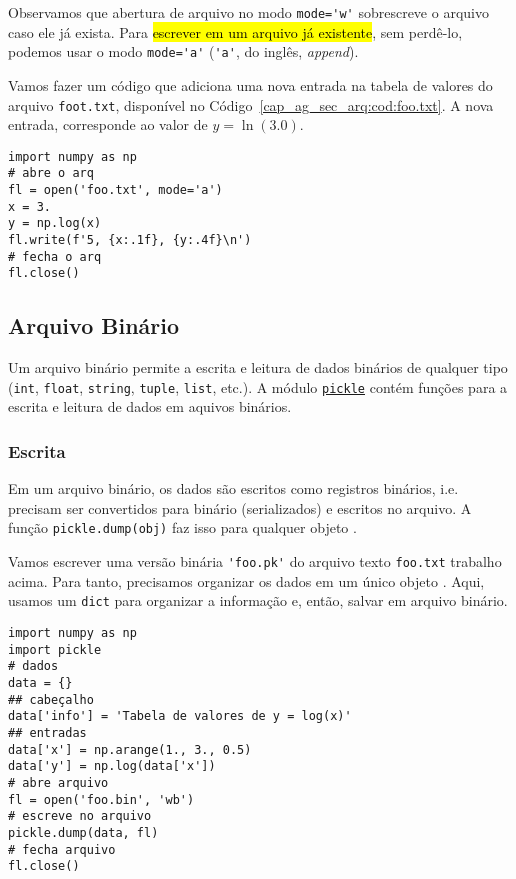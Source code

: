 Observamos que abertura de arquivo no modo \lstinline+mode='w'+ sobrescreve o arquivo caso ele já exista. Para \hl{escrever em um arquivo já existente}, sem perdê-lo, podemos usar o modo \lstinline+mode='a'+ (\lstinline+'a'+, do inglês, \textit{append}).

\begin{ex}
  Vamos fazer um código que adiciona uma nova entrada na tabela de valores do arquivo \lstinline+foot.txt+, disponível no Código~\ref{cap_ag_sec_arq:cod:foo.txt}. A nova entrada, corresponde ao valor de $y = \ln(3.0)$.
\begin{lstlisting}
import numpy as np
# abre o arq
fl = open('foo.txt', mode='a')
x = 3.
y = np.log(x)
fl.write(f'5, {x:.1f}, {y:.4f}\n')
# fecha o arq
fl.close()
\end{lstlisting}
\end{ex}

\subsection{Arquivo Binário}\label{cap_ag_sec_arq:ssec:arqbin}

Um arquivo binário permite a escrita e leitura de dados binários de qualquer tipo (\lstinline+int+, \lstinline+float+, \lstinline+string+, \lstinline+tuple+, \lstinline+list+, etc.). A módulo \href{https://docs.python.org/3/library/pickle.html}{\lstinline+pickle+} contém funções para a escrita e leitura de dados em aquivos binários.

\subsubsection{Escrita}

Em um arquivo binário, os dados são escritos como registros binários, i.e. precisam ser convertidos para binário (serializados) e escritos no arquivo. A função \lstinline+pickle.dump(obj)+ faz isso para qualquer objeto {\python}.

\begin{ex}
  Vamos escrever uma versão binária \lstinline+'foo.pk'+ do arquivo texto \lstinline+foo.txt+ trabalho acima. Para tanto, precisamos organizar os dados em um único objeto {\python}. Aqui, usamos um \lstinline+dict+ para organizar a informação e, então, salvar em arquivo binário.
\begin{lstlisting}[caption=foo.bin, label=cap_ag_sec_arq:cod:foo.bin]
import numpy as np
import pickle
# dados
data = {}
## cabeçalho
data['info'] = 'Tabela de valores de y = log(x)'
## entradas
data['x'] = np.arange(1., 3., 0.5)
data['y'] = np.log(data['x'])
# abre arquivo
fl = open('foo.bin', 'wb')
# escreve no arquivo
pickle.dump(data, fl)
# fecha arquivo
fl.close()
\end{lstlisting}
\end{ex}


